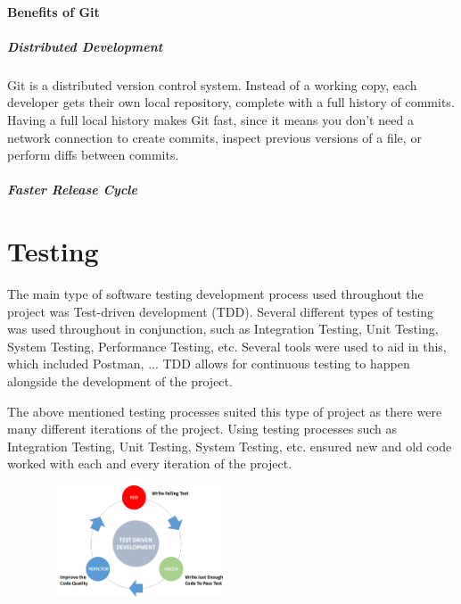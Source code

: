 \paragraph{Benefits of Git}
\subparagraph{Distributed Development}
Git is a distributed version control system. Instead of a working copy, each developer gets their own local repository, complete with a full history of commits. Having a full local history makes Git fast, since it means you don’t need a network connection to create commits, inspect previous versions of a file, or perform diffs between commits.

\subparagraph{Faster Release Cycle}


\section{Testing}
The main type of software testing development process used throughout the project was Test-driven development (TDD). Several different types of testing was used throughout in conjunction, such as Integration Testing, Unit Testing, System Testing, Performance Testing, etc. Several tools were used to aid in this, which included Postman, ... TDD allows for continuous testing to happen alongside the development of the project.
\par
\medskip
The above mentioned testing processes suited this type of project as there were many different iterations of the project. Using testing processes such as Integration Testing, Unit Testing, System Testing, etc. ensured new and old code worked with each and every iteration of the project.
\par
\medskip
\par
\medskip
\begin{center}
    \includegraphics[width=8cm,height=3.3cm,keepaspectratio]{images/tdd}
\end{center}
